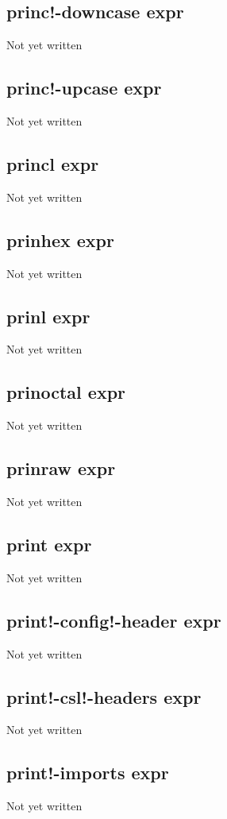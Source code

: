 \documentclass[a4paper,11pt]{article}
\begin{document}
\subsection{\ttfamily princ!-downcase expr}
Not yet written

\subsection{\ttfamily princ!-upcase expr}
Not yet written

\subsection{\ttfamily princl expr}
Not yet written

\subsection{\ttfamily prinhex expr}
Not yet written

\subsection{\ttfamily prinl expr}
Not yet written

\subsection{\ttfamily prinoctal expr}
Not yet written

\subsection{\ttfamily prinraw expr}
Not yet written

\subsection{\ttfamily print expr}
Not yet written

\subsection{\ttfamily print!-config!-header expr}
Not yet written

\subsection{\ttfamily print!-csl!-headers expr}
Not yet written

\subsection{\ttfamily print!-imports expr}
Not yet written
\end{document}
